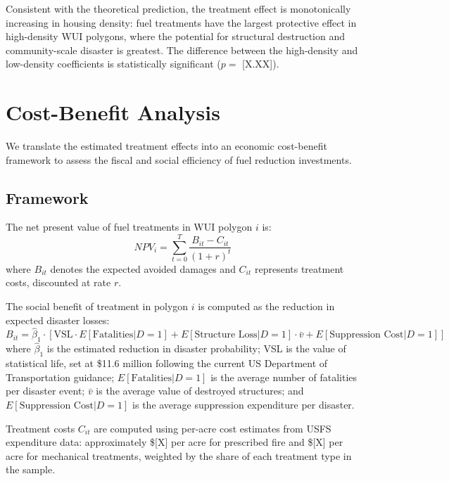 \documentclass[12pt, letterpaper]{article}
\begin{document}
Consistent with the theoretical prediction, the treatment effect is monotonically increasing in housing density: fuel treatments have the largest protective effect in high-density WUI polygons, where the potential for structural destruction and community-scale disaster is greatest. The difference between the high-density and low-density coefficients is statistically significant ($p = $ [X.XX]).


\section{Cost-Benefit Analysis}

We translate the estimated treatment effects into an economic cost-benefit framework to assess the fiscal and social efficiency of fuel reduction investments.

\subsection{Framework}

The net present value of fuel treatments in WUI polygon $i$ is:
\begin{equation}
    NPV_i = \sum_{t=0}^{T} \frac{B_{it} - C_{it}}{(1 + r)^t}
    \label{eq:npv}
\end{equation}
where $B_{it}$ denotes the expected avoided damages and $C_{it}$ represents treatment costs, discounted at rate $r$.

The social benefit of treatment in polygon $i$ is computed as the reduction in expected disaster losses:
\begin{equation}
    B_{it} = \hat{\beta}_1 \cdot \left[\text{VSL} \cdot E[\text{Fatalities}|D=1] + E[\text{Structure Loss}|D=1] \cdot \bar{v} + E[\text{Suppression Cost}|D=1]\right]
    \label{eq:benefit}
\end{equation}
where $\hat{\beta}_1$ is the estimated reduction in disaster probability; VSL is the value of statistical life, set at \$11.6 million following the current US Department of Transportation guidance; $E[\text{Fatalities}|D=1]$ is the average number of fatalities per disaster event; $\bar{v}$ is the average value of destroyed structures; and $E[\text{Suppression Cost}|D=1]$ is the average suppression expenditure per disaster.

Treatment costs $C_{it}$ are computed using per-acre cost estimates from USFS expenditure data: approximately \$[X] per acre for prescribed fire and \$[X] per acre for mechanical treatments, weighted by the share of each treatment type in the sample.
\end{document}
